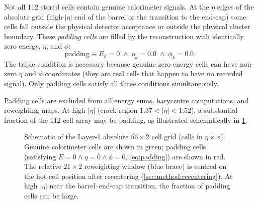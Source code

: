 \documentclass[11pt,a4paper]{article}
\newcommand{\abseta}{|\eta|}
\begin{document}
Not all 112 stored cells contain genuine calorimeter signals.  At
the $\eta$ edges of the absolute grid (high-$\abseta$ end of the
barrel or the transition to the end-cap) some cells fall outside
the physical detector acceptance or outside the physical cluster
boundary.  These \emph{padding cells} are filled by the reconstruction
with identically zero energy, $\eta$, and $\phi$:
\begin{equation}
  \text{padding} \equiv
  E_{k} = 0 \;\wedge\; \eta_{k} = 0.0 \;\wedge\; \phi_{k} = 0.0\,.
  \label{eq:padding}
\end{equation}
The triple condition is necessary because genuine zero-energy cells
can have non-zero $\eta$ and $\phi$ coordinates (they are real cells
that happen to have no recorded signal).  Only padding cells satisfy
all three conditions simultaneously.

Padding cells are excluded from all energy sums, barycentre
computations, and reweighting maps.  At high $\abseta$
(crack region $1.37 < \abseta < 1.52$), a substantial fraction of
the 112-cell array may be padding, as illustrated schematically in
\cref{fig:padding}.

\begin{figure}[htbp]
  \centering
  \caption{Schematic of the Layer-1 absolute $56 \times 2$ cell grid
           (cells in $\eta \times \phi$).  Genuine calorimeter cells
           are shown in green; padding cells (satisfying
           $E = 0 \wedge \eta = 0 \wedge \phi = 0$, \cref{eq:padding})
           are shown in red.  The relative $21 \times 2$ reweighting
           window (blue brace) is centred on the hot-cell position
           after recentering (\cref{sec:method:recentering}).  At
           high $\abseta$ near the barrel--end-cap transition, the
           fraction of padding cells can be large.}
  \label{fig:padding}
\end{figure}
\end{document}
